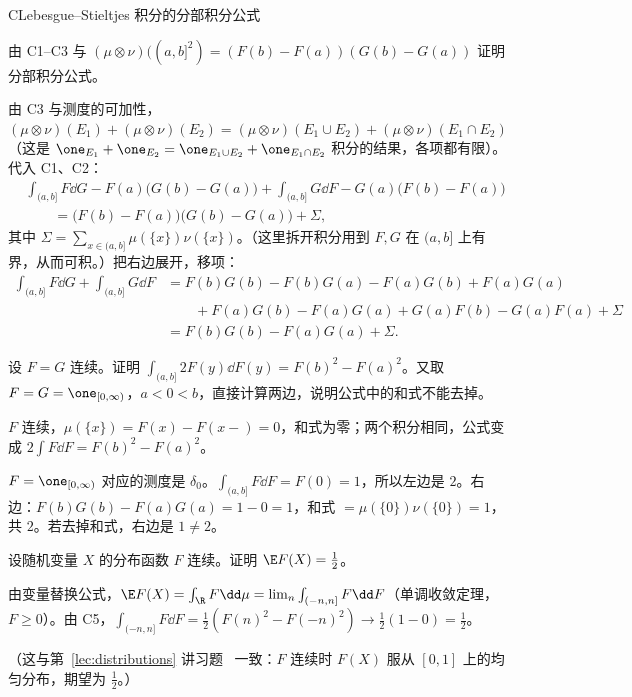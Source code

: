 \begin{probleme}{C}{Lebesgue--Stieltjes 积分的分部积分公式}
\begin{questions}
\item 由 C1--C3 与 $(\mu\otimes\nu)((a,b]^2)=(F(b)-F(a))(G(b)-G(a))$ 证明分部积分公式。
\begin{solution}
由 C3 与测度的可加性，$(\mu\otimes\nu)(E_1)+(\mu\otimes\nu)(E_2)=(\mu\otimes\nu)(E_1\cup E_2)+(\mu\otimes\nu)(E_1\cap E_2)$（这是 $\one_{E_1}+\one_{E_2}=\one_{E_1\cup E_2}+\one_{E_1\cap E_2}$ 积分的结果，各项都有限）。代入 C1、C2：
\[
\begin{aligned}
&\int_{(a,b]}F\dd G-F(a)\bigl(G(b)-G(a)\bigr)+\int_{(a,b]}G\dd F-G(a)\bigl(F(b)-F(a)\bigr)\\
&\qquad=\bigl(F(b)-F(a)\bigr)\bigl(G(b)-G(a)\bigr)+\Sigma,
\end{aligned}
\]
其中 $\Sigma=\sum_{x\in(a,b]}\mu(\{x\})\nu(\{x\})$。（这里拆开积分用到 $F,G$ 在 $(a,b]$ 上有界，从而可积。）把右边展开，移项：
\[
\begin{aligned}
\int_{(a,b]}F\dd G+\int_{(a,b]}G\dd F&=F(b)G(b)-F(b)G(a)-F(a)G(b)+F(a)G(a)\\
&\qquad+F(a)G(b)-F(a)G(a)+G(a)F(b)-G(a)F(a)+\Sigma\\
&=F(b)G(b)-F(a)G(a)+\Sigma .
\end{aligned}
\]
\end{solution}

\item 设 $F=G$ 连续。证明 $\int_{(a,b]}2F(y)\dd F(y)=F(b)^2-F(a)^2$。又取 $F=G=\one_{[0,\infty)}$，$a<0<b$，直接计算两边，说明公式中的和式不能去掉。
\begin{solution}
$F$ 连续，$\mu(\{x\})=F(x)-F(x-)=0$，和式为零；两个积分相同，公式变成 $2\int F\dd F=F(b)^2-F(a)^2$。

$F=\one_{[0,\infty)}$ 对应的测度是 $\delta_0$。$\int_{(a,b]}F\dd F=F(0)=1$，所以左边是 $2$。右边：$F(b)G(b)-F(a)G(a)=1-0=1$，和式 $=\mu(\{0\})\nu(\{0\})=1$，共 $2$。若去掉和式，右边是 $1\neq2$。
\end{solution}

\item 设随机变量 $X$ 的分布函数 $F$ 连续。证明 $\E F(X)=\frac12$。
\begin{solution}
由变量替换公式，$\E F(X)=\int_\R F\dd\mu=\lim_n\int_{(-n,n]}F\dd F$（单调收敛定理，$F\geqslant0$）。由 C5，$\int_{(-n,n]}F\dd F=\frac12(F(n)^2-F(-n)^2)\to\frac12(1-0)=\frac12$。

（这与第~\ref{lec:distributions} 讲习题~ 一致：$F$ 连续时 $F(X)$ 服从 $[0,1]$ 上的均匀分布，期望为 $\frac12$。）
\end{solution}
\end{questions}
\end{probleme}

